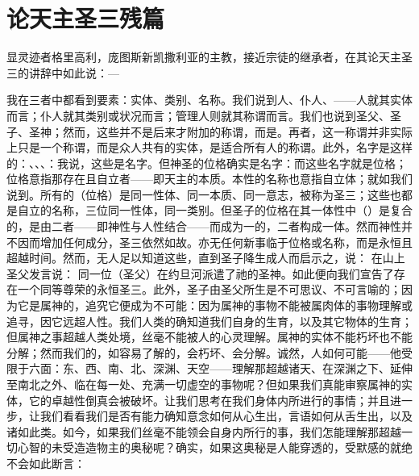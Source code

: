 
\chapter{论天主圣三残篇}


显灵迹者格里高利，庞图斯新凯撒利亚的主教，接近宗徒的继承者，在其论天主圣三的讲辞中如此说：—\par

我在三者中都看到要素：实体、类别、名称。我们说到人、仆人、——人就其实体而言；仆人就其类别或状况而言；管理人则就其称谓而言。我们也说到圣父、圣子、圣神；然而，这些并不是后来才附加的称谓，而是。再者，这一称谓并非实际上只是一个称谓，而是众人共有的实体，是适合所有人的称谓。此外，名字是这样的：、、、：我说，这些是名字。但神圣的位格确实是名字：而这些名字就是位格；位格意指那存在且自立者——即天主的本质。本性的名称也意指自立体；就如我们说到。所有的（位格）是同一性体、同一本质、同一意志，被称为圣三；这些也都是自立的名称，三位同一性体，同一类别。但圣子的位格在其一体性中（）是复合的，是由二者——即神性与人性结合——而成为一的，二者构成一体。然而神性并不因而增加任何成分，圣三依然如故。亦无任何新事临于位格或名称，而是永恒且超越时间。然而，无人足以知道这些，直到圣子降生成人而启示之，说：  在山上圣父发言说：  同一位（圣父）在约旦河派遣了祂的圣神。如此便向我们宣告了存在一个同等尊荣的永恒圣三。此外，圣子由圣父所生是不可思议、不可言喻的；因为它是属神的，追究它便成为不可能：因为属神的事物不能被属肉体的事物理解或追寻，因它远超人性。我们人类的确知道我们自身的生育，以及其它物体的生育；但属神之事超越人类处境，丝毫不能被人的心灵理解。属神的实体不能朽坏也不能分解；然而我们的，如容易了解的，会朽坏、会分解。诚然，人如何可能——他受限于六面：东、西、南、北、深渊、天空——理解那超越诸天、在深渊之下、延伸至南北之外、临在每一处、充满一切虚空的事物呢？但如果我们真能审察属神的实体，它的卓越性倒真会被破坏。让我们思考在我们身体内所进行的事情；并且进一步，让我们看看我们是否有能力确知意念如何从心生出，言语如何从舌生出，以及诸如此类。如今，如果我们丝毫不能领会自身内所行的事，我们怎能理解那超越一切心智的未受造造物主的奥秘呢？确实，如果这奥秘是人能穿透的，受默感的就绝不会如此断言：  